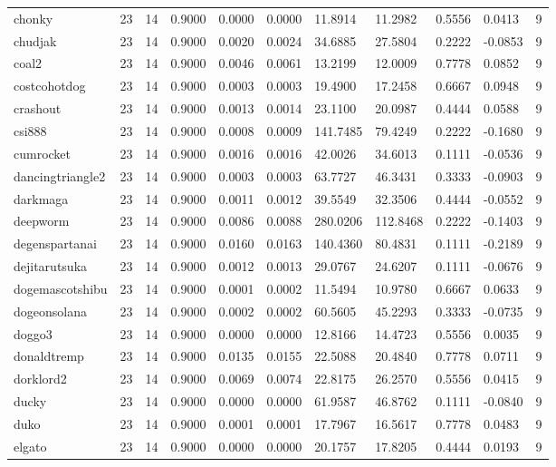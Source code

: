 \begin{table}[htbp]
\begin{tabular}{lllllllllll}
chonky & 23 & 14 & 0.9000 & 0.0000 & 0.0000 & 11.8914 & 11.2982 & 0.5556 & 0.0413 & 9 \\
chudjak & 23 & 14 & 0.9000 & 0.0020 & 0.0024 & 34.6885 & 27.5804 & 0.2222 & -0.0853 & 9 \\
coal2 & 23 & 14 & 0.9000 & 0.0046 & 0.0061 & 13.2199 & 12.0009 & 0.7778 & 0.0852 & 9 \\
costcohotdog & 23 & 14 & 0.9000 & 0.0003 & 0.0003 & 19.4900 & 17.2458 & 0.6667 & 0.0948 & 9 \\
crashout & 23 & 14 & 0.9000 & 0.0013 & 0.0014 & 23.1100 & 20.0987 & 0.4444 & 0.0588 & 9 \\
csi888 & 23 & 14 & 0.9000 & 0.0008 & 0.0009 & 141.7485 & 79.4249 & 0.2222 & -0.1680 & 9 \\
cumrocket & 23 & 14 & 0.9000 & 0.0016 & 0.0016 & 42.0026 & 34.6013 & 0.1111 & -0.0536 & 9 \\
dancingtriangle2 & 23 & 14 & 0.9000 & 0.0003 & 0.0003 & 63.7727 & 46.3431 & 0.3333 & -0.0903 & 9 \\
darkmaga & 23 & 14 & 0.9000 & 0.0011 & 0.0012 & 39.5549 & 32.3506 & 0.4444 & -0.0552 & 9 \\
deepworm & 23 & 14 & 0.9000 & 0.0086 & 0.0088 & 280.0206 & 112.8468 & 0.2222 & -0.1403 & 9 \\
degenspartanai & 23 & 14 & 0.9000 & 0.0160 & 0.0163 & 140.4360 & 80.4831 & 0.1111 & -0.2189 & 9 \\
dejitarutsuka & 23 & 14 & 0.9000 & 0.0012 & 0.0013 & 29.0767 & 24.6207 & 0.1111 & -0.0676 & 9 \\
dogemascotshibu & 23 & 14 & 0.9000 & 0.0001 & 0.0002 & 11.5494 & 10.9780 & 0.6667 & 0.0633 & 9 \\
dogeonsolana & 23 & 14 & 0.9000 & 0.0002 & 0.0002 & 60.5605 & 45.2293 & 0.3333 & -0.0735 & 9 \\
doggo3 & 23 & 14 & 0.9000 & 0.0000 & 0.0000 & 12.8166 & 14.4723 & 0.5556 & 0.0035 & 9 \\
donaldtremp & 23 & 14 & 0.9000 & 0.0135 & 0.0155 & 22.5088 & 20.4840 & 0.7778 & 0.0711 & 9 \\
dorklord2 & 23 & 14 & 0.9000 & 0.0069 & 0.0074 & 22.8175 & 26.2570 & 0.5556 & 0.0415 & 9 \\
ducky & 23 & 14 & 0.9000 & 0.0000 & 0.0000 & 61.9587 & 46.8762 & 0.1111 & -0.0840 & 9 \\
duko & 23 & 14 & 0.9000 & 0.0001 & 0.0001 & 17.7967 & 16.5617 & 0.7778 & 0.0483 & 9 \\
elgato & 23 & 14 & 0.9000 & 0.0000 & 0.0000 & 20.1757 & 17.8205 & 0.4444 & 0.0193 & 9 \\

\end{tabular}
\end{table}
